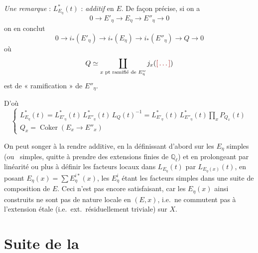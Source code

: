 \documentclass[11pt,a4paper]{article}
\begin{document}
\emph{Une remarque} :  $L^{*}_{E_\eta}(t)$ :
\emph{\ill{} \ill{} \ill{}} \emph{additif} en $E$. De façon précise, si on a
\[
  0 \to E'_\eta \to E_\eta \to E''_\eta \to 0
\]
on en conclut
\[
  0 \to i_{*}(E'_\eta) \to i_{*}(E_\eta) \to i_{*}(E''_\eta) \to Q \to 0
\]
où
\[
  Q \simeq \coprod_{x \text{ pt ramifié de } E''_\eta} j_x(\ill{})
\]
est \ill{} \ill{} \ill{} \ill{} de « ramification » de $E''_\eta$.

D'où
\[
  \left\lbrace
  \begin{array}{l}
    L^{*}_{E_\eta}(t) = L^{*}_{E'_\eta}(t)\, L^{*}_{E''_\eta}(t)\, L_Q(t)^{-1}
      = L^{*}_{E'_\eta}(t)\, L^{*}_{E''_\eta}(t) \prod_x P_{Q_x}(t) \\[8pt]
    Q_x = \operatorname{Coker}(E_x \to E''_x)
  \end{array}
  \right.
\]

On peut songer à la rendre additive, en la définissant d'abord sur les
$E_\eta$ simples (ou \ simples, quitte à prendre des
extensions finies de $\mathbb{Q}_\ell$) et en prolongeant par linéarité ou
plus  à définir les facteurs locaux dans
$L_{E_\eta}(t)$ par $L_{E_\eta(x)}(t)$, en posant
$E_\eta(x) = \sum E^{i*}_\eta(x)$, les $E^{i}_\eta$ étant les facteurs
simples dans une suite de composition de $E$. Ceci n'est pas encore
satisfaisant, car les $E_\eta(x)$ ainsi construits ne sont pas de nature
locale en $(E, x)$, i.e.\ ne commutent pas à l'extension étale
 (i.e.\ ext.\ résiduellement \add{\ill{}} triviale) sur $X$.

\section{Suite de la }
\end{document}
